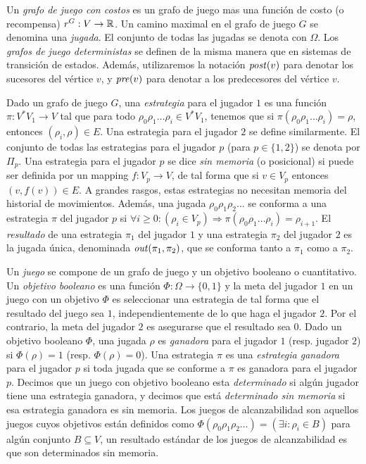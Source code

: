 Un \emph{grafo de juego con costos} es un grafo de juego mas una función de costo (o recompensa) $\mathit{r}^G:V \rightarrow \mathbb{R}$. Un camino maximal en el grafo de juego $G$ se denomina una \emph{jugada}. El conjunto de todas las jugadas se denota con $\Omega$. Los \emph{grafos de juego deterministas} se definen de la misma manera que en sistemas de transición de estados. Además, utilizaremos la notación $\mathit{post}(v)$ para denotar los sucesores del vértice $v$, y $\mathit{pre}(v)$ para denotar a los predecesores del vértice $v$.

Dado un grafo de juego $G$, una \emph{estrategia} para el jugador $1$ es una función $\pi: V^{*} V_1 \rightarrow V$ tal que para todo  $\rho_0  \rho_1 \dots \rho_i \in V^{*} V_1$, tenemos que si $\pi(\rho_0  \rho_1\dots \rho_i) = \rho $, entonces $(\rho_i, \rho) \in E$. Una estrategia para el jugador $2$ se define similarmente. El conjunto de todas las estrategias para el jugador $p$ (para $p \in \{1,2\}$) se denota por $\Pi_{p}$.
Una estrategia para el jugador $p$ se dice \emph{sin memoria} (o posicional) si puede ser definida por un mapping $f:V_p \rightarrow V$, de tal forma que si $v \in V_p$ entonces $(v, f(v)) \in E$.
A grandes rasgos, estas estrategias no necesitan memoria del historial de movimientos. Además, una jugada $\rho_0 \rho_1 \rho_2 \dots$ se conforma a una estrategia $\pi$ del jugador $p$ si $\forall i \geq 0: (\rho_i \in V_p) \Rightarrow  \pi(\rho_0 \rho_1 \dots \rho_i) = \rho_{i+1}$. El \emph{resultado} de una estrategia $\pi_{1}$ del jugador $1$ y una estrategia $\pi_{2}$ del jugador $2$ es la jugada única, denominada $\mathit{out}(\pi_1, \pi_2)$, que se conforma tanto a $\pi_1$ como a $\pi_2$.

Un \emph{juego} se compone de un grafo de juego y un objetivo booleano o cuantitativo. Un \emph{objetivo booleano} es una función $\Phi: \Omega \rightarrow \{0, 1\}$ y la meta del jugador $1$ en un juego con un objetivo $\Phi$ es seleccionar una estrategia de tal forma que el resultado del juego sea $1$, independientemente de lo que haga el jugador $2$. Por el contrario, la meta del jugador $2$ es asegurarse que el resultado sea $0$. Dado un objetivo booleano $\Phi$, una jugada $\rho$ es \emph{ganadora} para el jugador $1$ (resp. jugador $2$) si  $\Phi(\rho) = 1$ (resp. $\Phi(\rho) = 0$). Una estrategia $\pi$ es una \emph{estrategia ganadora} para el jugador $p$ si toda jugada que se conforme a $\pi$ es ganadora para el jugador $p$. Decimos que un juego con objetivo booleano esta \emph{determinado} si algún jugador tiene una estrategia ganadora, y decimos que está \emph{determinado sin memoria} si esa estrategia ganadora es sin memoria. Los juegos de alcanzabilidad son aquellos juegos cuyos objetivos están definidos como $\Phi(\rho_0 \rho_1 \rho_2 \dots) = (\exists i : \rho_i \in B)$ para algún conjunto $B \subseteq V$, un resultado estándar de los juegos de alcanzabilidad es que son determinados sin memoria.

